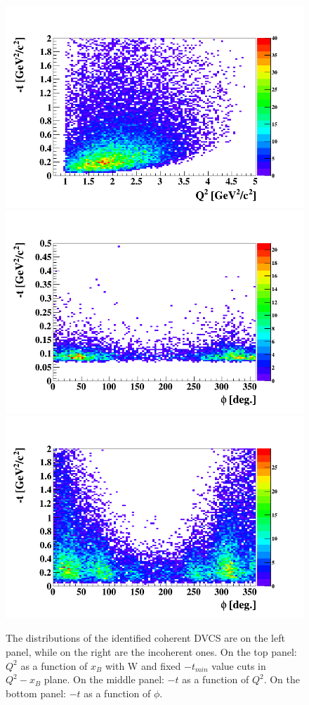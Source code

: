 \begin{figure}[h!]
\includegraphics[scale=0.35]{fig_dvcs/new_t_Q2_InCoh.png}
\includegraphics[scale=0.35]{fig_dvcs/new_phi_t_Coh.png}
\includegraphics[scale=0.35]{fig_dvcs/new_phi_t_InCoh.png}
\caption{The distributions of the identified coherent DVCS are on the left 
   panel, while on the right are the incoherent ones. On the top panel: $Q^2$ 
as a function of $x_B$ with W and fixed $-t_{min}$ value cuts in $Q^{2}-x_{B}$ 
plane. On the middle panel: $-t$ as a function of $Q^2$.  On the bottom panel: 
$-t$ as a function of $\phi$.} \label{fig:kinematic_coverage}
\end{figure}

